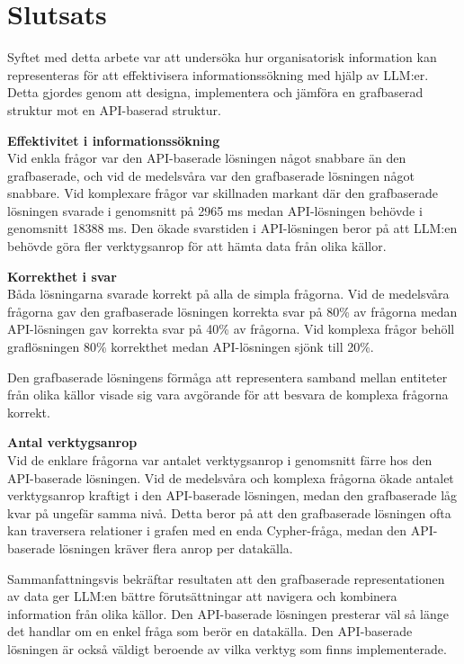 \section{Slutsats}\label{sec:conclusions}

Syftet med detta arbete var att undersöka hur organisatorisk information kan representeras för att effektivisera informationssökning med hjälp av LLM:er.
Detta gjordes genom att designa, implementera och jämföra en grafbaserad struktur mot en API-baserad struktur.

\textbf{Effektivitet i informationssökning} \\
Vid enkla frågor var den API-baserade lösningen något snabbare än den grafbaserade, och vid de medelsvåra var den grafbaserade lösningen något snabbare.
Vid komplexare frågor var skillnaden markant där den grafbaserade lösningen svarade i genomsnitt på 2965 ms medan API-lösningen behövde i genomsnitt 18388 ms.
Den ökade svarstiden i API-lösningen beror på att LLM:en behövde göra fler verktygsanrop för att hämta data från olika källor.

\textbf{Korrekthet i svar} \\
Båda lösningarna svarade korrekt på alla de simpla frågorna.
Vid de medelsvåra frågorna gav den grafbaserade lösningen korrekta svar på 80\% av frågorna medan API-lösningen gav korrekta svar på 40\% av frågorna.
Vid komplexa frågor behöll graflösningen 80\% korrekthet medan
API-lösningen sjönk till 20\%.
  
Den grafbaserade lösningens förmåga att representera samband mellan entiteter från olika källor visade sig vara avgörande för att besvara de komplexa frågorna korrekt.

\textbf{Antal verktygsanrop} \\
Vid de enklare frågorna var antalet verktygsanrop i genomsnitt färre hos den API-baserade lösningen.
Vid de medelsvåra och komplexa frågorna ökade antalet verktygsanrop kraftigt i den API-baserade lösningen, medan den grafbaserade låg kvar på ungefär samma nivå.
Detta beror på att den grafbaserade lösningen ofta kan traversera relationer i grafen med en enda Cypher-fråga, medan den API-baserade lösningen kräver flera anrop per datakälla.

Sammanfattningsvis bekräftar resultaten att den grafbaserade representationen av data ger LLM:en bättre förutsättningar att navigera och kombinera information från olika källor.
Den API-baserade lösningen presterar väl så länge det handlar om en enkel fråga som berör en datakälla. Den API-baserade lösningen är också väldigt beroende av vilka verktyg som finns implementerade.

